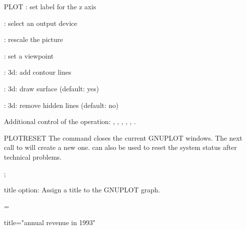 \begin{Command}{PLOT}
: set label for the z axis

: select an output device

: rescale the picture

: set a viewpoint

: 3d: add contour lines

: 3d: draw surface (default: yes)

: 3d: remove hidden lines (default: no)


Additional control of the  operation:
,
, , ,
, .

\end{Command}

\begin{Command}{PLOTRESET}
The command  closes the current GNUPLOT windows.
The next call to  will create a new one. 
can also be used to reset the system status after technical problems.

\begin{Syntax}
;
\end{Syntax}
\end{Command}


\begin{Variable}{title}
 option:
Assign a title to the GNUPLOT graph.

\begin{Syntax}
 = 
\end{Syntax}
\begin{Examples}
title="annual revenue in 1993"\\
\end{Examples}
\end{Variable}

